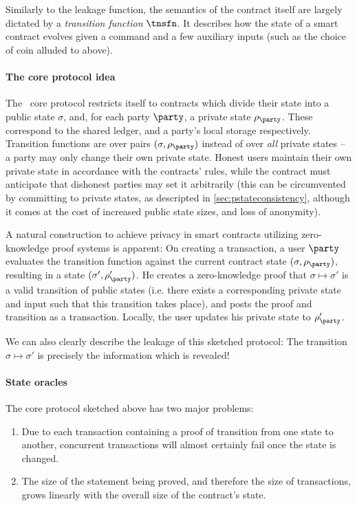 Similarly to the leakage function, the semantics of the contract itself are
largely dictated by a \emph{transition function} $\tnsfn$. It describes how the
state of a smart contract evolves given a command and a few auxiliary inputs
(such as the choice of coin alluded to above).

\paragraph{The core protocol idea}

The \kachina\ core protocol restricts itself to contracts which divide
their state into a public state $\sigma$, and, for each party $\party$, a
private state $\rho_\party$. These correspond to the shared ledger, and a
party's local storage respectively. Transition functions are over pairs
$(\sigma, \rho_\party)$ instead of over \emph{all} private states -- a party may
only change their own private state. Honest users maintain their own private
state in accordance with the contracts' rules, while the contract must
anticipate that dishonest parties may set it arbitrarily (this can be
circumvented by committing to private states, as descripted in
\iffull\autoref{sec:pstateconsistency}\else\cite[Appendix~G]{fullversion}\fi, although it comes at the cost of increased
public state sizes, and loss of anonymity).

A natural construction to achieve privacy in smart contracts utilizing
zero-knowledge proof systems is apparent: On
creating a transaction, a user $\party$ evaluates the transition function against the
current contract state $(\sigma, \rho_\party)$, resulting in a state $(\sigma',
\rho'_\party)$. He creates a zero-knowledge proof that $\sigma \mapsto \sigma'$
is a valid transition of public states (i.e. there exists a corresponding
private state and input such that this transition takes place), and posts the
proof and transition as a transaction.
Locally, the user updates his private state to $\rho'_\party$.

We can also clearly describe the leakage of this sketched protocol: The
transition $\sigma \mapsto \sigma'$ is precisely the information which is
revealed!

\paragraph{State oracles}

The core protocol sketched above has two major problems:
\begin{enumerate}
  \item Due to each transaction containing a proof of transition from one state to another,
    concurrent transactions will almost certainly fail once the state is changed.
  \item The size of the statement being proved, and therefore the size of transactions,
    grows linearly with the overall size of the contract's state.
\end{enumerate}

